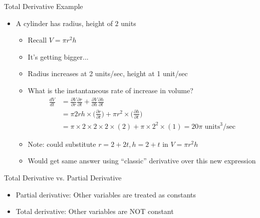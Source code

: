 \documentclass[aspectratio=169]{beamer}
\begin{document}
\begin{frame}{Total Derivative Example}

\begin{itemize}
	\item A cylinder has radius, height of $2$ units 
	\begin{itemize}
		\item Recall $V = \pi r^2 h$
		\item It's getting bigger...
		\item Radius increases at 2 units/sec, height at 1 unit/sec
	\item What is the instantaneous rate of increase in volume?
		\begin{align}
		\frac{dV}{dt} &= \frac{\partial V}{\partial r} \frac{\partial r}{\partial t} +
                         \frac{\partial V}{\partial h} \frac{\partial h}{\partial t} \nonumber \\
			&= \pi 2r h \times  \Big( \frac{\partial r}{\partial t} \Big) + 
				\pi r^2 \times  \Big( \frac{\partial h}{\partial t} \Big) \nonumber \\
			&= \pi \times 2 \times 2  \times 2 \times (2) + \pi \times 2^2 \times (1) = 20\pi \textrm{ units}^3/\textrm{sec}\nonumber \end{align}
		\item Note: could substitute $r = 2 + 2t, h = 2 + t$ in $V = \pi r^2 h$
		\item Would get same answer
			using ``classic'' derivative over this new expression
	\end{itemize}
\end{itemize}
\end{frame}
\begin{frame}{Total Derivative vs. Partial Derivative}

\begin{itemize}
	\item Partial derivative: Other variables are treated as constants
	\item Total derivative: Other variables are NOT constant
\end{itemize}
\end{frame}
\end{document}
